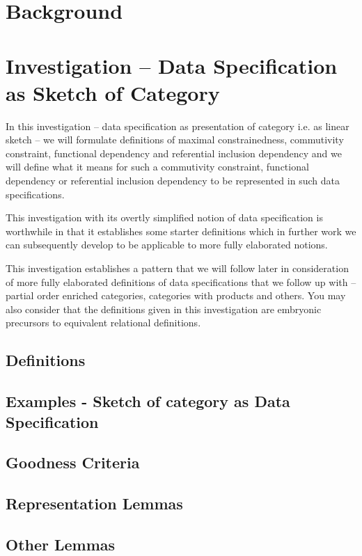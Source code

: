 \documentclass[10pt,a4paper]{article}
\theoremstyle{remark}
\begin{document}
\section{Background}


\section{Investigation -- Data Specification as Sketch of Category}
\note
In this investigation -- data specification as presentation of category i.e. as linear sketch \cite{BarrandWells}-- we will formulate 
definitions of maximal constrainedness, commutivity constraint, functional dependency and referential inclusion dependency
and we will define what it means for such a commutivity constraint, functional dependency or  referential inclusion dependency to be represented in such data specifications.

\note
This investigation with its overtly simplified notion of data specification is worthwhile in that   it establishes some starter definitions which in further work we can subsequently develop to be applicable to more fully elaborated notions.

\note 
This investigation establishes a pattern that we will follow later in consideration of more fully elaborated 
definitions of 
data specifications that we follow up with -- partial order enriched categories, categories with products and others. 
You may also consider that the definitions given in this investigation are embryonic precursors to equivalent relational definitions.


\subsection{Definitions}



\subsection{Examples - Sketch of category as Data Specification}

\subsection{Goodness Criteria}

\subsection{Representation Lemmas}

\subsection{Other Lemmas}


 

\end{document}
